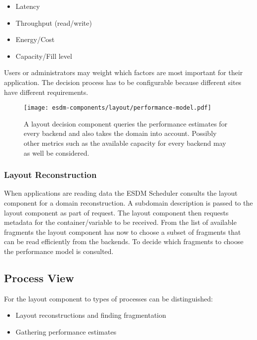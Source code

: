 \begin{itemize}
	\item Latency
	\item Throughput (read/write)
	\item Energy/Cost
	\item Capacity/Fill level
\end{itemize}

Users or administrators may weight which factors are most important for their application.
The decision process has to be configurable because different sites have different requirements.

\begin{figure}
	\centering
	\texttt{[image: esdm-components/layout/performance-model.pdf]}
	\caption{A layout decision component queries the performance estimates for every backend and also takes the domain into account. Possibly other metrics such as the available capacity for every backend may as well be considered.}
	\label{fig:esdm layout choose backend}
\end{figure}



\subsubsection{Layout Reconstruction}

When applications are reading data the ESDM Scheduler consults the layout component for a domain reconstruction.
A subdomain description is passed to the layout component as part of request.
The layout component then requests metadata for the container/variable to be received.
From the list of available fragments the layout component has now to choose a subset of fragments that can be read efficiently from the backends.
To decide which fragments to choose the performance model is consulted.


\subsection{Process View}

For the layout component to types of processes can be distinguished:

\begin{itemize}
	\item Layout reconstructions and finding fragmentation
	\item Gathering performance estimates
\end{itemize}

